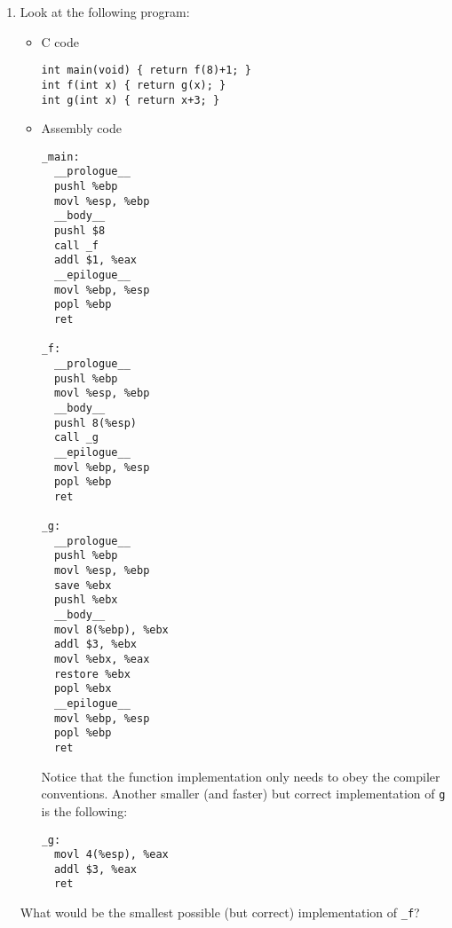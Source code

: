 \begin{enumerate}
\item Look at the following program:
\begin{itemize}
\item C code
\begin{verbatim}
int main(void) { return f(8)+1; }
int f(int x) { return g(x); }
int g(int x) { return x+3; }
\end{verbatim}
\item Assembly code
\begin{verbatim}
_main:
  __prologue__
  pushl %ebp
  movl %esp, %ebp
  __body__
  pushl $8
  call _f
  addl $1, %eax
  __epilogue__
  movl %ebp, %esp
  popl %ebp
  ret

_f:
  __prologue__
  pushl %ebp
  movl %esp, %ebp
  __body__
  pushl 8(%esp)
  call _g
  __epilogue__
  movl %ebp, %esp
  popl %ebp
  ret

_g:
  __prologue__
  pushl %ebp
  movl %esp, %ebp
  save %ebx
  pushl %ebx
  __body__
  movl 8(%ebp), %ebx
  addl $3, %ebx
  movl %ebx, %eax
  restore %ebx
  popl %ebx
  __epilogue__
  movl %ebp, %esp
  popl %ebp
  ret
\end{verbatim}
Notice that the function implementation only needs to obey the compiler conventions.
Another smaller (and faster) but correct implementation of {\tt g} is the following:
\begin{verbatim}
_g:
  movl 4(%esp), %eax
  addl $3, %eax
  ret
\end{verbatim}
\end{itemize}
What would be the smallest possible (but correct) implementation of {\tt \_f}?

\end{enumerate}

